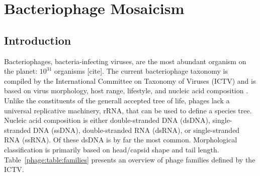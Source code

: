 \chapter{Bacteriophage Mosaicism}
\label{ch:phage}

\section{Introduction}
\label{phage:sec:introduction}

Bacteriophages, bacteria-infecting viruses, are the most abundant organism on the planet: $10^31$ organisms [cite].
The current bacteriophage taxonomy is compiled by the International Committee on Taxonomy of Viruses (ICTV) and is based on virus morphology, host range, lifestyle, and nucleic acid composition \cite{ICTV:2012}.
Unlike the constituents of the generall accepted tree of life, phages lack a universal replicative machinery, rRNA, that can be used to define a species tree.
Nucleic acid composition is either double-stranded DNA (dsDNA), single-stranded DNA (ssDNA), double-stranded RNA (dsRNA), or single-stranded RNA (ssRNA).
Of these dsDNA is by far the most common.
Morphological classification is primarily based on head/capsid shape and tail length.
Table~\ref{phage:table:families} presents an overview of phage families defined by the ICTV.

